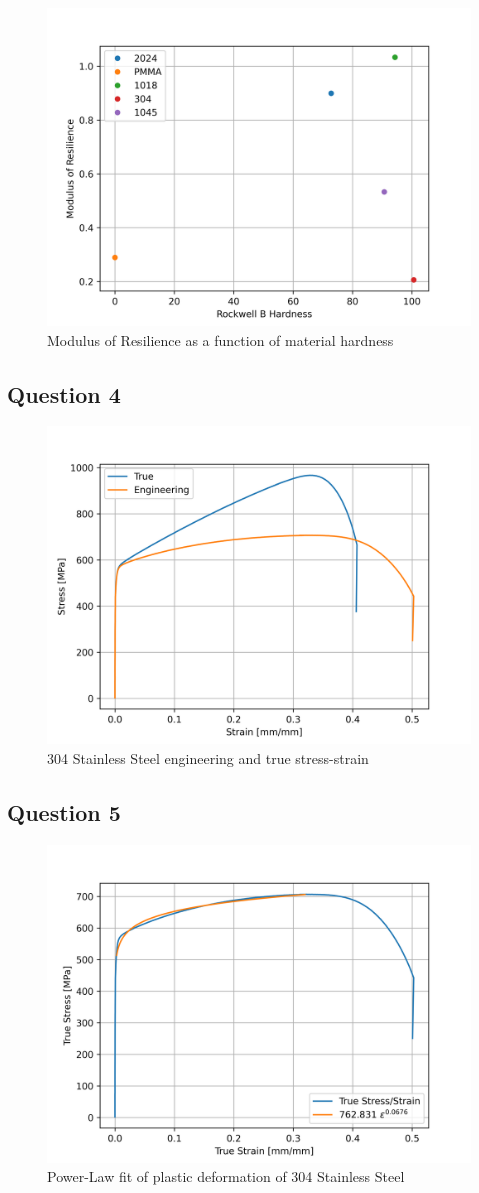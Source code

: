 \documentclass{article}
\begin{document}
\begin{figure}[!h!]
\begin{minipage}[b]{0.5\linewidth}
  \end{minipage} 
  \begin{minipage}[b]{\linewidth}
      \centering
      \includegraphics[width = .5\linewidth]{plots/q3_resilmod.png}
      \caption{Modulus of Resilience as a function of material hardness}
  \end{minipage}
\end{figure}
\newpage

\subsection{Question 4}
\begin{figure}
    \centering
    \includegraphics[width=0.5\linewidth]{plots/q4_evt.png}
    \caption{304 Stainless Steel engineering and true stress-strain}
    \label{fig:q4evt}
\end{figure}

\subsection{Question 5}
\begin{figure}
    \centering
    \includegraphics[width=0.5\linewidth]{plots/q5_fit.png}
    \caption{Power-Law fit of plastic deformation of 304 Stainless Steel}
    \label{fig:q5fit}
\end{figure}
\end{document}
